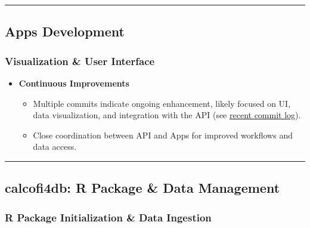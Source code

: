 \documentclass[
  letterpaper,
  DIV=11,
  numbers=noendperiod]{scrreprt}
\providecommand{\tightlist}{%
  \setlength{\itemsep}{0pt}\setlength{\parskip}{0pt}}
\begin{document}
\begin{center}\rule{0.5\linewidth}{0.5pt}\end{center}

\subsection{Apps Development}\label{apps-development}

\subsubsection{Visualization \& User
Interface}\label{visualization-user-interface}

\begin{itemize}
\tightlist
\item
  \textbf{Continuous Improvements}

  \begin{itemize}
  \tightlist
  \item
    Multiple commits indicate ongoing enhancement, likely focused on UI,
    data visualization, and integration with the API (see
    \href{https://github.com/CalCOFI/apps/commits}{recent commit log}).
  \item
    Close coordination between API and Apps for improved workflows and
    data access.
  \end{itemize}
\end{itemize}

\begin{center}\rule{0.5\linewidth}{0.5pt}\end{center}

\subsection{calcofi4db: R Package \& Data
Management}\label{calcofi4db-r-package-data-management}

\subsubsection{R Package Initialization \& Data
Ingestion}\label{r-package-initialization-data-ingestion}
\end{document}
